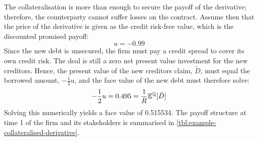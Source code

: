 \documentclass[main.tex]{subfiles}
\begin{document}
        The collateralisation is more than enough to secure the payoff of the derivative;
        therefore, the counterparty cannot suffer losses on the contract.
        Assume then that the price of the derivative is given as the credit risk-free
        value, which is the discounted promised payoff:
            \begin{equation*}
                u = \num{-0.99}
            \end{equation*}
        Since the new debt is unsecured, 
        the firm must pay a credit spread to cover its own credit risk. 
        The deal is still a zero net present value investment for the new creditors.
        Hence, the present value of the new creditors claim, $\tilde{D}$, 
        must equal the borrowed amount, $- \frac{1}{2}u$,
        and the face value of the new debt must therefore solve:
            \begin{equation*}
                -
                \frac{1}{2} 
                u
                = 
                \num{0.495}
                =
                \frac{1}{R}
                \mathbb{E}^{\mathbb{Q}}[\tilde{D}]
            \end{equation*}
        Solving this numerically yields a face value of \num{0.515534}.
        The payoff structure at time 1 of the firm and its stakeholders
        is summarised in \cref{tbl:example-collateralised-derivative}.
\end{document}
